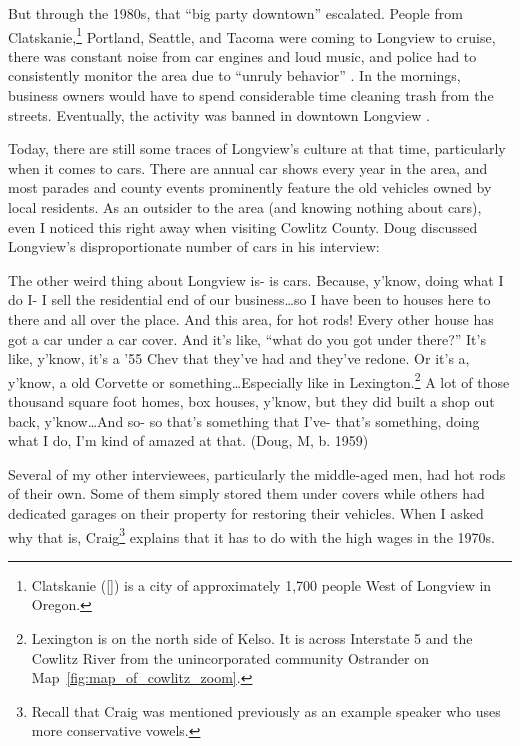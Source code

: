 But through the 1980s, that ``big party downtown'' escalated. People from Clatskanie,\footnote{Clatskanie ([]) is a city of approximately 1,700 people West of Longview in Oregon.} Portland, Seattle, and Tacoma were coming to Longview to cruise, there was constant noise from car engines and loud music, and police had to consistently monitor the area due to ``unruly behavior'' \citep[5]{longview_1991_minutes}. In the mornings, business owners would have to spend considerable time cleaning trash from the streets. Eventually, the activity was banned in downtown Longview \citep{longview_1991_municipal_code}.

Today, there are still some traces of Longview's culture at that time, particularly when it comes to cars. There are annual car shows every year in the area, and most parades and county events prominently feature the old vehicles owned by local residents. As an outsider to the area (and knowing nothing about cars), even I noticed this right away when visiting Cowlitz County. Doug discussed Longview's disproportionate number of cars in his interview:
\begin{num_quote}
    The other weird thing about Longview is- is cars. Because, y'know, doing what I do I- I sell the residential end of our business\ldots so I have been to houses here to there and all over the place. And this area, for hot rods! Every other house has got a car under a car cover. And it's like, ``what do you got under there?'' It's like, y'know, it's a '55 Chev that they've had and they've redone. Or it's a, y'know, a old Corvette or something\ldots Especially like in Lexington.\footnote{Lexington is on the north side of Kelso. It is across Interstate 5 and the Cowlitz River from the unincorporated community Ostrander on Map~\ref{fig:map_of_cowlitz_zoom}.}  A lot of those thousand square foot homes, box houses, y'know, but they did built a shop out back, y'know\ldots And so- so that's something that I've- that's something, doing what I do, I'm kind of amazed at that. (Doug, M, b. 1959)
    \label{quote:hot_rods}
\end{num_quote}
Several of my other interviewees, particularly the middle-aged men, had hot rods of their own. Some of them simply stored them under covers while others had dedicated garages on their property for restoring their vehicles. When I asked why that is, Craig\footnote{Recall that Craig was mentioned previously as an example speaker who uses more conservative vowels.} explains that it has to do with the high wages in the 1970s.
